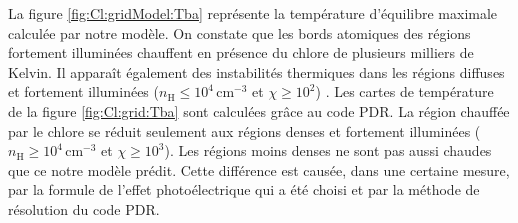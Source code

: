 La figure \ref{fig:Cl:gridModel:Tba} représente la température d'équilibre maximale calculée par notre modèle. On constate que les bords atomiques des régions fortement illuminées chauffent en présence du chlore de plusieurs milliers de Kelvin. 
Il apparaît également des instabilités thermiques dans les régions diffuses et fortement illuminées ($n_\mathrm{H} \leq 10^4 \, \mathrm{cm}^{-3}$ et $\chi \geq 10^2$) . Les cartes de température de la figure \ref{fig:Cl:grid:Tba} sont calculées grâce au code PDR. La région chauffée par le chlore se réduit seulement aux régions denses et fortement illuminées ($n_\mathrm{H} \geq 10^4 \, \mathrm{cm}^{-3}$ et $\chi \geq 10^3$). Les régions moins denses ne sont pas aussi chaudes que ce notre modèle prédit. Cette différence est causée, dans une certaine mesure, par la formule de l'effet photoélectrique qui a été choisi et par la méthode de résolution du code PDR.  \newline 


